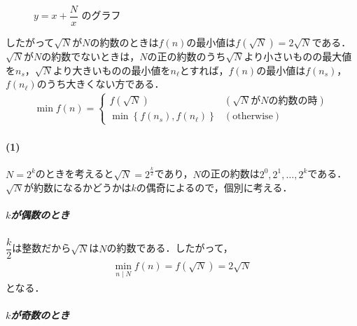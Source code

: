 \documentclass[../../main.tex]{subfiles}
\begin{document}
\begin{figure}[htb]
  \caption{$y = x + \dfrac{N}{x}$ のグラフ}
  \label{fig:fx_min_and_divisors}
\end{figure}

したがって$\sqrt{N}$が$N$の約数のときは$f(n)$の最小値は$f(\sqrt{N})=2\sqrt{N}$である．
$\sqrt{N}$が$N$の約数でないときは，$N$の正の約数のうち$\sqrt{N}$より小さいものの最大値を$n_s$，$\sqrt{N}$より大きいものの最小値を$n_\ell$とすれば，$f(n)$の最小値は$f(n_s)$，$f(n_\ell)$のうち大きくない方である．
\begin{align}
  \min f(n) =
  \begin{cases}
    f\left(\sqrt{N}\right) & (\text{$\sqrt{N}$が$N$の約数の時}) \\
    \min \left\{f(n_{s}), f(n_{\ell})\right\} & (\text{otherwise})
  \end{cases} \label{eq:2}
\end{align}

\paragraph{(1)}

$N=2^k$のときを考えると$\sqrt{N}=2^{\frac{k}{2}}$であり，$N$の正の約数は$2^0,2^1,\dots,2^k$である．$\sqrt{N}$が約数になるかどうかは$k$の偶奇によるので，個別に考える．

\subparagraph{$k$が偶数のとき}

$\dfrac{k}{2}$は整数だから$\sqrt{N}$は$N$の約数である．したがって，
\begin{align}
  \min_{n\mid N}f(n)=f(\sqrt{N})=2\sqrt{N} \label{eq:3}
\end{align}
となる．

\subparagraph{$k$が奇数のとき}
\end{document}
